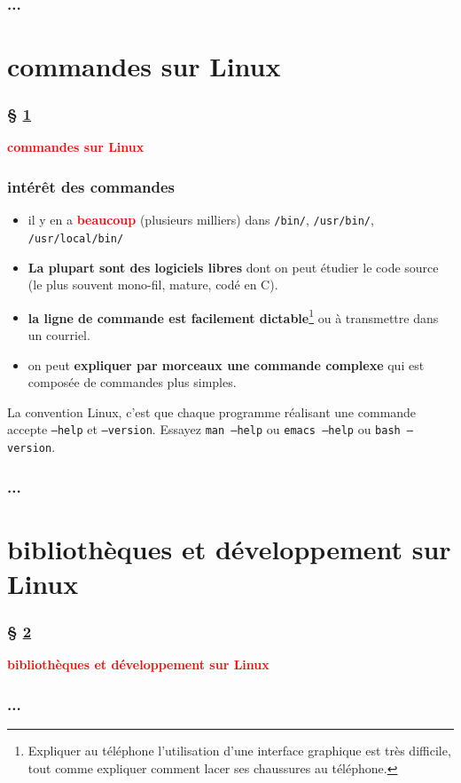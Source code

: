 \documentclass[lualatex,11pt,a4paper,svgnames,french]{beamer}
\newcommand{\clbrougras}[1]{{\textcolor{Red}{\textbf{#1}}}}
\begin{document}
\begin{frame}\frametitle{...}
  {}
\end{frame}
\section{commandes sur Linux}
\label{sec:commands}
\begin{frame}\frametitle{§ \ref{sec:commands}}
{\Large \clbrougras{commandes sur Linux}}
\end{frame}
\begin{frame}\frametitle{intérêt des commandes}

  \begin{itemize}
\item il y en a \clbrougras{beaucoup} (plusieurs milliers) dans \texttt{/bin/},
  \texttt{/usr/bin/}, \texttt{/usr/local/bin/}
\item \textbf{La plupart sont des logiciels libres} dont on peut
  étudier le code source (le plus souvent mono-fil, mature, codé en C).
  \item \textbf{la ligne de commande est facilement
    dictable}\footnote{Expliquer au téléphone l'utilisation d'une
  interface graphique est très difficile, tout comme expliquer comment
  lacer ses chaussures au téléphone.\medskip} ou à transmettre dans un
    courriel.
    \item on peut \textbf{expliquer par morceaux une commande
      complexe} qui est composée de commandes plus simples.
  \end{itemize}

  La convention Linux, c'est que chaque programme réalisant une
  commande accepte \texttt{--help} et \texttt{--version}. Essayez
  \texttt{man --help} ou \texttt{emacs --help} ou \texttt{bash
    --version}.
\end{frame}
\begin{frame}\frametitle{...}
  {}
\end{frame}

\section{bibliothèques et développement sur Linux}
\label{sec:libr-devel}
\begin{frame}\frametitle{§ \ref{sec:libr-devel}}
{\Large \clbrougras{bibliothèques et développement sur Linux}}
\end{frame}

\begin{frame}\frametitle{...}
  {}
\end{frame}
\end{document}
